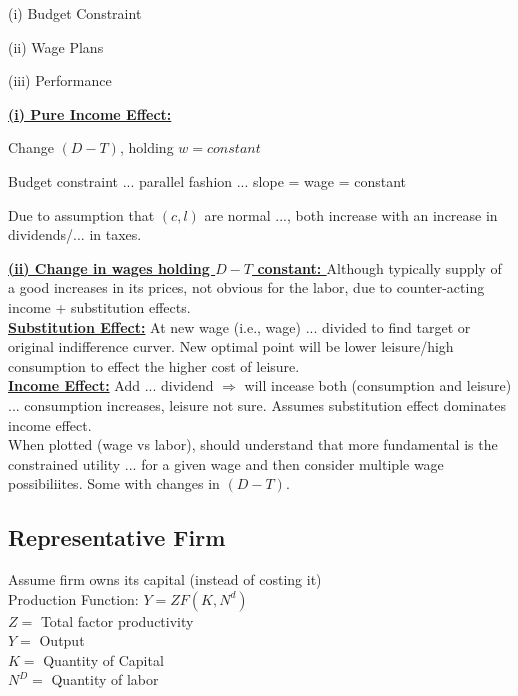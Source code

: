 \begin{list}{ }{}
\item (i) Budget Constraint
\item (ii) Wage Plans
\item (iii) Performance
\end{list}
\textbf{\underline{(i) Pure Income Effect: }} 
\begin{list}{ }{}
\item Change $(D-T)$, holding $w = constant $
\item Budget constraint ... parallel fashion ... slope = wage = constant
\item Due to assumption that $(c,l)$ are normal ..., both increase with an increase in dividends/... in taxes.
\end{list}
\textbf{\underline{(ii) Change in wages holding $D - T$ constant: }} Although typically supply of a good increases in its prices, not obvious for the labor, due to counter-acting income + substitution effects.\\


\textbf{\underline{Substitution Effect:}} At new wage (i.e., wage) ... divided to find target or original indifference curver. New optimal point will be lower leisure/high consumption to effect the higher cost of leisure.\\

\textbf{\underline{Income Effect:}} Add ... dividend $ \Longrightarrow $ will incease both (consumption and leisure) ... consumption increases, leisure not sure. Assumes substitution effect dominates income effect.\\

When plotted (wage vs labor), should understand that more fundamental is the constrained utility ... for a given wage and then consider multiple wage possibiliites. Some with changes in $(D-T)$.\\

\subsection*{Representative Firm}
Assume firm owns its capital (instead of costing it)\\

Production Function: $ Y = Z F(K, N^d)$\\
$Z = $ Total factor productivity\\
$Y = $ Output\\
$K = $ Quantity of Capital\\
$N^D = $ Quantity of labor\\

